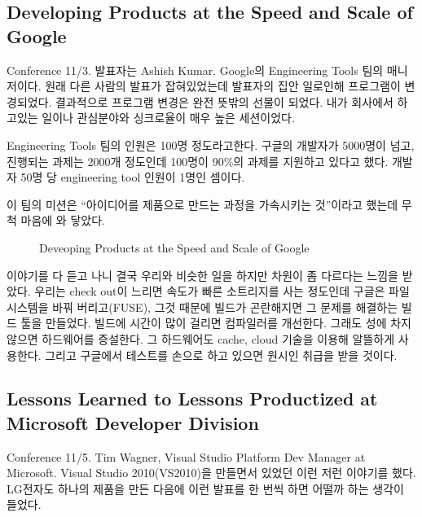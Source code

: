 \documentclass[11pt]{article}
\begin{document}
\subsection{Developing Products at the Speed and Scale of Google}

Conference 11/3.
발표자는 Ashish Kumar. Google의 Engineering Tools 팀의 매니저이다.
원래 다른 사람의 발표가 잡혀있었는데 발표자의 집안 일로인해 프로그램이 
변경되었다. 결과적으로 프로그램 변경은 완전 뜻밖의 선물이 되었다. 
내가 회사에서 하고있는 일이나 관심분야와 싱크로율이 매우 높은 세션이었다.

Engineering Tools 팀의 인원은 100명 정도라고한다. 
구글의 개발자가 5000명이 넘고, 진행되는 과제는
2000개 정도인데 100명이 90\%의 과제를 지원하고 있다고 했다. 
개발자 50명 당 engineering tool 인원이 1명인 셈이다.

 
이 팀의 미션은 ``아이디어를 제품으로 만드는 과정을 가속시키는
것''이라고 했는데 무척 마음에 와 닿았다.

\begin{figure}[t]
    \begin{Frame}
        \begin{center}
        \end{center}
    \end{Frame}
    \caption{Deveoping Products at the Speed and Scale of Google}
    \label{google}
\end{figure}
 
이야기를 다 듣고 나니 결국 우리와 비슷한 일을 하지만 차원이 좀 다르다는
느낌을 받았다. 우리는 check out이 느리면 속도가 빠른 소트리지를 사는
정도인데 구글은 파일시스템을 바꿔 버리고(FUSE), 그것 때문에 빌드가 곤란해지면
그 문제를 해결하는 빌드 툴을 만들었다. 빌드에 시간이 많이 걸리면
컴파일러를 개선한다. 그래도 성에 차지 않으면 하드웨어를 증설한다. 그
하드웨어도 cache, cloud 기술을 이용해 알뜰하게 사용한다. 그리고
구글에서 테스트를 손으로 하고 있으면 원시인 취급을 받을 것이다.

\subsection{Lessons Learned to Lessons Productized at
  Microsoft Developer Division}

Conference 11/5. Tim Wagner, Visual Studio Platform Dev Manager at Microsoft.
Visual Studio 2010(VS2010)을 만들면서 있었던 이런 저런 이야기를
했다. LG전자도 하나의 제품을 만든 다음에 이런 발표를 한 번씩 하면 어떨까
하는 생각이 들었다.
 
\end{document}
